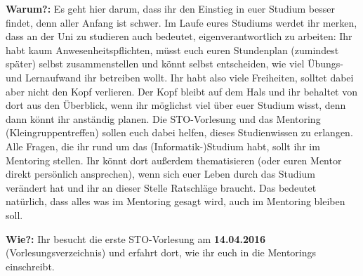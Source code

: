 \textbf{Warum?:} Es geht hier darum, dass ihr den Einstieg in euer Studium besser findet, denn aller Anfang ist schwer. Im Laufe eures Studiums werdet ihr merken, dass an der Uni zu studieren auch bedeutet, eigenverantwortlich zu arbeiten: Ihr habt kaum Anwesenheitspflichten, müsst euch euren Stundenplan (zumindest später) selbst zusammenstellen und könnt selbst entscheiden, wie viel Übungs- und Lernaufwand ihr betreiben wollt.
Ihr habt also viele Freiheiten, solltet dabei aber nicht den Kopf verlieren. Der Kopf bleibt auf dem Hals und ihr behaltet von dort aus den Überblick, wenn ihr möglichst viel über euer Studium wisst, denn dann könnt ihr anständig planen.
Die STO-Vorlesung und das Mentoring (Kleingruppentreffen) sollen euch dabei helfen, dieses Studienwissen zu erlangen. Alle Fragen, die ihr rund um das (Informatik-)Studium habt, sollt ihr im Mentoring stellen. Ihr könnt dort außerdem thematisieren (oder euren Mentor direkt persönlich ansprechen), wenn sich euer Leben durch das Studium verändert hat und ihr an dieser Stelle Ratschläge braucht. Das bedeutet natürlich, dass alles was im Mentoring gesagt wird, auch im Mentoring bleiben soll.

\textbf{Wie?:} Ihr besucht die erste STO-Vorlesung am \textbf{14.04.2016} (Vorlesungsverzeichnis) und erfahrt dort, wie ihr euch in die Mentorings einschreibt.
\spaltenende
